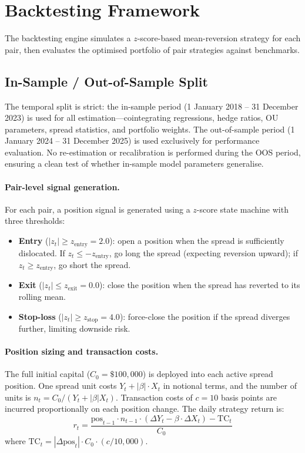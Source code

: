 \documentclass[a4paper]{report}
\begin{document}
\section{Backtesting Framework}
\label{sec:backtesting}

The backtesting engine simulates a $z$-score-based mean-reversion strategy for each pair, then evaluates the optimised portfolio of pair strategies against benchmarks.

\subsection{In-Sample / Out-of-Sample Split}

The temporal split is strict: the in-sample period (1 January 2018 -- 31 December 2023) is used for all estimation---cointegrating regressions, hedge ratios, OU parameters, spread statistics, and portfolio weights. The out-of-sample period (1 January 2024 -- 31 December 2025) is used exclusively for performance evaluation. No re-estimation or recalibration is performed during the OOS period, ensuring a clean test of whether in-sample model parameters generalise.

\paragraph{Pair-level signal generation.} For each pair, a position signal is generated using a $z$-score state machine with three thresholds:
\begin{itemize}
    \item \textbf{Entry} ($|z_t| \geq z_{\text{entry}} = 2.0$): open a position when the spread is sufficiently dislocated. If $z_t \leq -z_{\text{entry}}$, go long the spread (expecting reversion upward); if $z_t \geq z_{\text{entry}}$, go short the spread.
    \item \textbf{Exit} ($|z_t| \leq z_{\text{exit}} = 0.0$): close the position when the spread has reverted to its rolling mean.
    \item \textbf{Stop-loss} ($|z_t| \geq z_{\text{stop}} = 4.0$): force-close the position if the spread diverges further, limiting downside risk.
\end{itemize}

\paragraph{Position sizing and transaction costs.} The full initial capital ($C_0 = \$100{,}000$) is deployed into each active spread position. One spread unit costs $Y_t + |\beta| \cdot X_t$ in notional terms, and the number of units is $n_t = C_0 / (Y_t + |\beta| X_t)$. Transaction costs of $c = 10$ basis points are incurred proportionally on each position change. The daily strategy return is:
\begin{equation}
r_t = \frac{\text{pos}_{t-1} \cdot n_{t-1} \cdot (\Delta Y_t - \beta \cdot \Delta X_t) - \text{TC}_t}{C_0}
\label{eq:backtest_return}
\end{equation}
where $\text{TC}_t = |\Delta \text{pos}_t| \cdot C_0 \cdot (c / 10{,}000)$.
\end{document}
